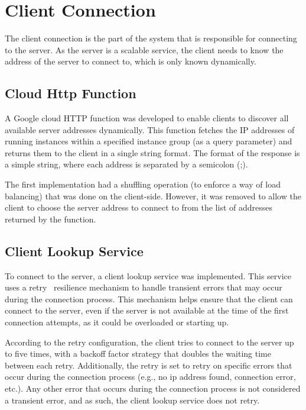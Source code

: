 \chapter{Client Connection}\label{ch:client-connection}

The client connection is the part of the system that is responsible for connecting to the server.
As the server is a scalable service, the client needs to know the address of the server to connect to, which is only known dynamically.


\section{Cloud Http Function}\label{sec:cloud-http-functions}

A Google cloud HTTP function was developed to enable clients to discover all available server addresses dynamically.
This function fetches the IP addresses of running instances within a specified instance group
(as a query parameter) and returns them to the client in a single string format.
The format of the response is a simple string, where each address is separated by a semicolon (;).

The first implementation had a shuffling operation
(to enforce a way of load balancing) that was done on the client-side.
However, it was removed to allow the client to choose the server address to connect to from the list of addresses returned by the function.


\section{Client Lookup Service}\label{sec:client-lookup-service}

To connect to the server, a client lookup service was implemented.
This service uses a retry~\cite{retry-pattern} resilience mechanism to handle transient errors that may occur during the connection process.
This mechanism helps ensure that the client can connect to the server,
even if the server is not available at the time of the first connection attempts, as it could be overloaded or starting up.

According to the retry configuration, the client tries to connect to the server up to five times,
with a backoff factor strategy that doubles the waiting time between each retry.
Additionally,
the retry is set to retry on specific errors that occur during the connection process
(e.g., no ip address found, connection error, etc.).
Any other error that occurs during the connection process is not considered a transient error, and as such, the client lookup service does not retry.

